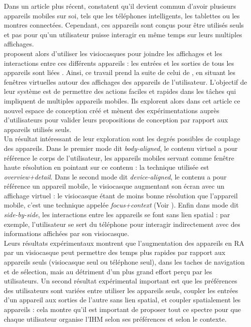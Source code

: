 
Dans un article plus récent, \cite{Grubert2015} constatent qu'il devient commun d'avoir plusieurs appareils mobiles sur soi, tels que les téléphones intelligents, les tablettes ou les montres connectées. Cependant, ces appareils sont conçus pour être utilisés seuls et pas pour qu'un utilisateur puisse interagir en même temps sur leurs multiples affichages.\\
\citeauthor{Grubert2015} proposent alors d'utiliser les visiocasques pour joindre les affichages et les interactions entre ces différents appareils : les entrées et les sorties de tous les appareils sont liées . Ainsi, ce travail prend la suite de celui de \citet{Ens2014}, en situant les fenêtres virtuelles autour des affichages des appareils de l'utilisateur. L'objectif de leur système est de permettre des actions faciles et rapides dans les tâches qui impliquent de multiples appareils mobiles. Ils explorent alors dans cet article ce nouvel espace de conception créé et mènent des expérimentations auprès d'utilisateurs pour valider leurs propositions de conception par rapport aux appareils utilisés seuls.\\
Un résultat intéressant de leur exploration sont les degrés possibles de couplage des appareils. Dans le premier mode dit \emph{body-aligned}, le contenu virtuel a pour référence le corps de l'utilisateur, les appareils mobiles servant comme fenêtre haute résolution en pointant sur ce contenu : la technique utilisée est \emph{overview+detail}. Dans le second mode dit \emph{device-aligned}, le contenu a pour référence un appareil mobile, le visiocasque augmentant son écran avec un affichage virtuel : le visiocasque étant de moins bonne résolution que l'appareil mobile, c'est une technique appelée \emph{focus+context} (Voir \cite{BaudischGoodStewart2001}). Enfin dans mode dit \emph{side-by-side}, les interactions entre les appareils se font sans lien spatial : par exemple, l'utilisateur se sert du téléphone pour interagir indirectement avec des informations affichées par son visiocasque.\\
Leurs résultats expérimentaux montrent que l'augmentation des appareils en RA par un visiocasque peut permettre des temps plus rapides par rapport aux appareils seuls (visiocasque seul ou téléphone seul), dans les taches de navigation et de sélection, mais au détriment d'un plus grand effort perçu par les utilisateurs. Un second résultat expérimental important est que les préférences des utilisateurs sont variées entre utiliser les appareils seuls, coupler les entrées d'un appareil aux sorties de l'autre sans lien spatial, et coupler spatialement les appareils : cela montre qu'il est important de proposer tout ce spectre pour que chaque utilisateur organise l'IHM selon ses préférences et selon le contexte.\\
